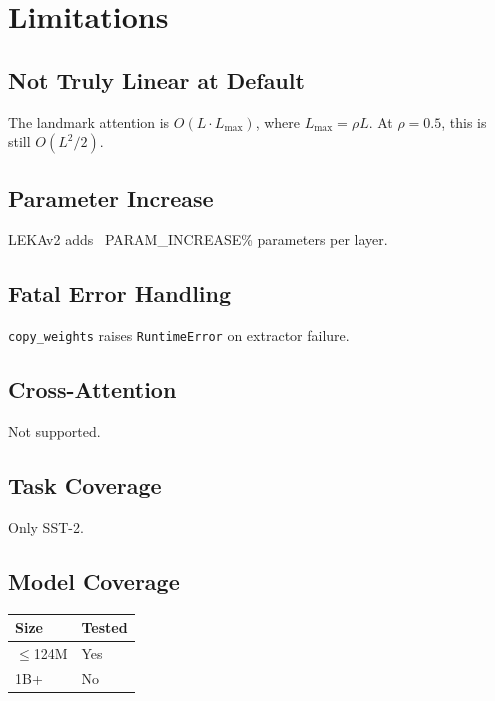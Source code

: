 \section{Limitations}

\subsection{Not Truly Linear at Default}

The landmark attention is $O(L \cdot L_\text{max})$, where $L_\text{max} = \rho L$. 
At $\rho = 0.5$, this is still $O(L^2/2)$.

\subsection{Parameter Increase}

LEKAv2 adds ~{{PARAM\_INCREASE}}\% parameters per layer.

\subsection{Fatal Error Handling}

\texttt{copy\_weights} raises \texttt{RuntimeError} on extractor failure.

\subsection{Cross-Attention}

Not supported.

\subsection{Task Coverage}

Only SST-2.

\subsection{Model Coverage}

\begin{table}[H]
\centering
\small
\begin{tabular}{ll}
\toprule
\textbf{Size} & \textbf{Tested} \\
\midrule
$\le$124M & Yes \\
1B+ & No \\
\bottomrule
\end{tabular}
\end{table}

